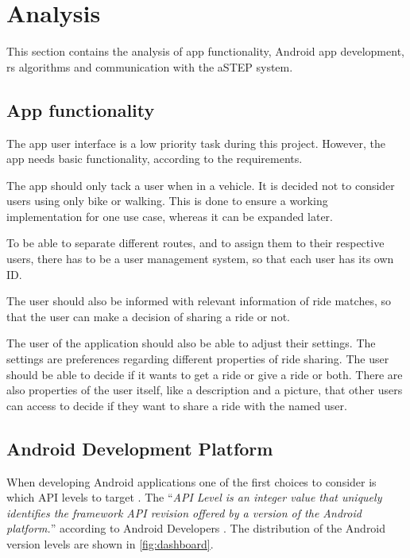 \section{Analysis}
This section contains the analysis of app functionality, Android app development, \gls{rs} algorithms and communication with the aSTEP system.

\subsection{App functionality}
The app user interface is a low priority task during this project.
However, the app needs basic functionality, according to the requirements.

The app should only tack a user when in a vehicle.
It is decided not to consider users using only bike or walking.
This is done to ensure a working implementation for one use case, whereas it can be expanded later. 

To be able to separate different routes, and to assign them to their respective users, there has to be a user management system, so that each user has its own ID.

The user should also be informed with relevant information of ride matches, so that the user can make a decision of sharing a ride or not.

The user of the application should also be able to adjust their settings.
The settings are preferences regarding different properties of ride sharing.
The user should be able to decide if it wants to get a ride or give a ride or both.
There are also properties of the user itself, like a description and a picture, that other users can access to decide if they want to share a ride with the named user.


\subsection{Android Development Platform}
When developing Android applications one of the first choices to consider is which API levels to target \cite{usesSDK}.
The ``\textit{API Level is an integer value that uniquely identifies the framework API revision offered by a version of the Android platform.}'' according to Android Developers \cite{usesSDK}.
The distribution of the Android version levels are shown in \ref{fig:dashboard}.

